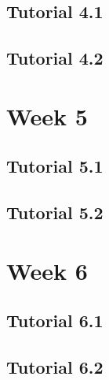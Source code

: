 \documentclass{article}
\begin{document}
\begin{multicols}{2}
\subsection{Tutorial 4.1}
\subsection{Tutorial 4.2}
\section{Week 5}
\subsection{Tutorial 5.1}
\subsection{Tutorial 5.2}
\section{Week 6}
\subsection{Tutorial 6.1}
\subsection{Tutorial 6.2}
\end{multicols}
\end{document}

